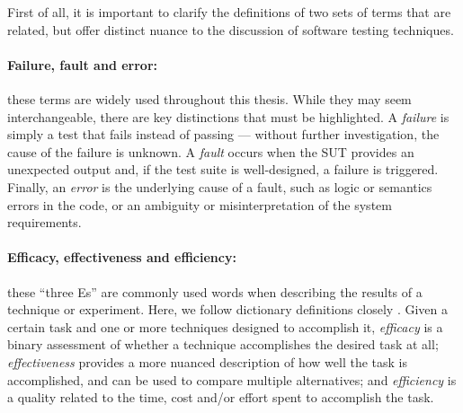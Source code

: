 
First of all, it is important to clarify the definitions of two sets of terms that are related, but offer distinct nuance to the discussion of software testing techniques.

\paragraph{Failure, fault and error: } these terms are widely used throughout this thesis.
While they may seem interchangeable, there are key distinctions that must be highlighted.
A \textit{failure} is simply a test that fails instead of passing --- without further investigation, the cause of the failure is unknown.
A \textit{fault} occurs when the SUT provides an unexpected output and, if the test suite is well-designed, a failure is triggered.
Finally, an \textit{error} is the underlying cause of a fault, such as logic or semantics errors in the code, or an ambiguity or misinterpretation of the system requirements.

\paragraph{Efficacy, effectiveness and efficiency: } these ``three Es'' are commonly used words when describing the results of a technique or experiment.
Here, we follow dictionary definitions closely \cite{dictionary_eff}.
Given a certain task and one or more techniques designed to accomplish it,
\textit{efficacy} is a binary assessment of whether a technique accomplishes the desired task at all;
\textit{effectiveness} provides a more nuanced description of how well the task is accomplished, and can be used to compare multiple alternatives; and
\textit{efficiency} is a quality related to the time, cost and/or effort spent to accomplish the task.